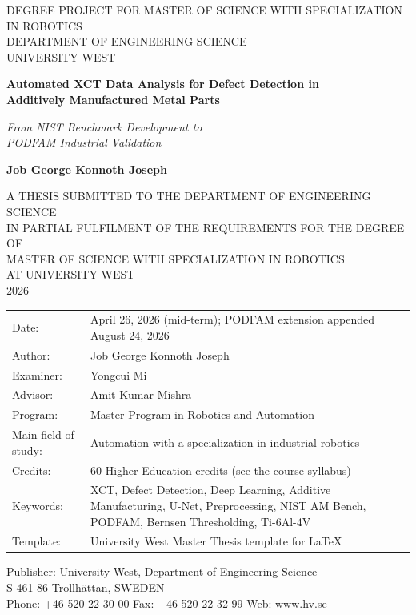 \begin{titlepage}
\centering
\vspace*{2cm}

{\normalsize DEGREE PROJECT FOR MASTER OF SCIENCE WITH SPECIALIZATION IN ROBOTICS}\\[2pt]
{\normalsize DEPARTMENT OF ENGINEERING SCIENCE}\\[2pt]
{\normalsize UNIVERSITY WEST}

\vspace{2cm}

{\huge\bfseries Automated XCT Data Analysis for Defect Detection in\\
Additively Manufactured Metal Parts\par}

\vspace{0.8cm}
{\Large\itshape From NIST Benchmark Development to\\
PODFAM Industrial Validation\par}

\vspace{1.5cm}
{\Large\bfseries Job George Konnoth Joseph\par}

\vspace{1.5cm}
{\normalsize
A THESIS SUBMITTED TO THE DEPARTMENT OF ENGINEERING SCIENCE\\
IN PARTIAL FULFILMENT OF THE REQUIREMENTS FOR THE DEGREE OF\\
MASTER OF SCIENCE WITH SPECIALIZATION IN ROBOTICS\\
AT UNIVERSITY WEST\\
2026\par}

\vspace{2cm}
\begin{tabular}{lp{10cm}}
Date: & April 26, 2026 (mid-term); PODFAM extension appended August 24, 2026 \\
Author: & Job George Konnoth Joseph \\
Examiner: & Yongcui Mi \\
Advisor: & Amit Kumar Mishra \\
Program: & Master Program in Robotics and Automation \\
Main field of study: & Automation with a specialization in industrial robotics \\
Credits: & 60 Higher Education credits (see the course syllabus) \\
Keywords: & XCT, Defect Detection, Deep Learning, Additive Manufacturing, U-Net,
          Preprocessing, NIST AM Bench, PODFAM, Bernsen Thresholding, Ti-6Al-4V \\
Template: & University West Master Thesis template for LaTeX \\
\end{tabular}

\vfill
{\small
Publisher: University West, Department of Engineering Science\\
S-461 86 Trollh\"attan, SWEDEN\\
Phone: +46 520 22 30 00 \quad Fax: +46 520 22 32 99 \quad Web: www.hv.se\par}

\end{titlepage}
